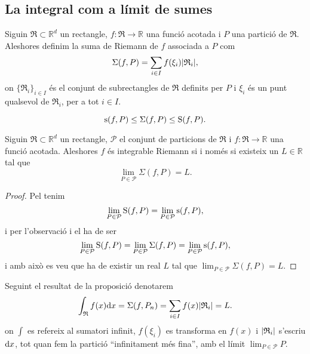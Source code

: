 \documentclass[../Apunts.tex]{subfiles}
\begin{document}
	\subsection{La integral com a límit de sumes}
	\begin{definition}
		\label{def:Suma de Riemann}
		Siguin \(\mathfrak{R}\subset\mathbb{R}^{d}\) un rectangle, \(f\colon\mathfrak{R}\to\mathbb{R}\) una funció acotada i \(P\) una partició de \(\mathfrak{R}\). Aleshores definim la suma de Riemann de \(f\) associada a \(P\) com
		\[\Sigma(f,P)=\sum_{i\in I}f(\xi_{i})\abs{\mathfrak{R}_{i}},\]
		on \(\{\mathfrak{R}_{i}\}_{i\in I}\) és el conjunt de subrectangles de \(\mathfrak{R}\) definits per \(P\) i \(\xi_{i}\) és un punt qualsevol de \(\mathfrak{R}_{i}\), per a tot \(i\in I\).
	\end{definition}
	\begin{observation}
		\label{obs:Sumes inferior i superior i suma de riemann}
		\[\operatorname{s}(f,P)\leq\Sigma(f,P)\leq\operatorname{S}(f,P).\]
	\end{observation}
	\begin{proposition}
		\label{prop:Integrable Riemann iff existeix la suma}
		Siguin \(\mathfrak{R}\subset\mathbb{R}^{d}\) un rectangle, \(\mathcal{P}\) el conjunt de particions de \(\mathfrak{R}\) i \(f\colon\mathfrak{R}\to\mathbb{R}\) una funció acotada. Aleshores \(f\) és integrable Riemann si i només si existeix un \(L\in\mathbb{R}\) tal que
		\[\lim_{P\in\mathcal{P}}\Sigma(f,P)=L.\]
		\begin{proof}
			Pel \corollari{}  tenim
			\[\lim_{P\in\mathcal{P}}\operatorname{S}(f,P)=\lim_{P\in\mathcal{P}}\operatorname{s}(f,P),\]
			i per l'observació  i el  ha de ser
			\[\lim_{P\in\mathcal{P}}\operatorname{S}(f,P)=\lim_{P\in\mathcal{P}}\Sigma(f,P)=\lim_{P\in\mathcal{P}}\operatorname{s}(f,P),\]
			i amb això es veu que ha de existir un real \(L\) tal que \(\lim_{P\in\mathcal{P}}\Sigma(f,P)=L\).
		\end{proof}
	\end{proposition}
	\begin{notation}
		Seguint el resultat de la proposició  denotarem
		\[\int_{\mathfrak{R}}f(x)\diff x=\Sigma(f,P_{n})=\sum_{i\in I}f(x)\abs{\mathfrak{R}_{i}}=L.\]
		on \(\int\) es refereix al sumatori infinit, \(f(\xi_{i})\) es transforma en \(f(x)\) i \(\abs{\mathfrak{R}_{i}}\) s'escriu \(\mathrm{d} x\), tot quan fem la partició ``infinitament més fina'', amb el límit \(\lim_{P\in\mathcal{P}}P\).%
	\end{notation}
\end{document}
